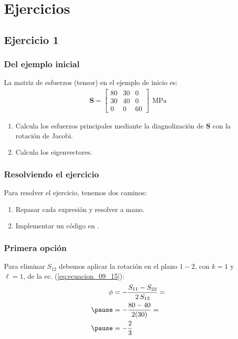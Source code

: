\documentclass[12pt]{beamer}
\begin{document}
\section{Ejercicios}
\subsection{Ejercicio 1}

\begin{frame}
\frametitle{Del ejemplo inicial}
La matriz de esfuerzos (tensor) en el ejemplo de inicio es:
\pause
\renewcommand{\arraystretch}{1}
\begin{align*}
\mathbf{S} =
\begin{bmatrix}
80 & 30 & 0 \\
30 & 40 & 0 \\
0 & 0 & 60
\end{bmatrix} \, \SI{}{\mega\pascal}
\end{align*}
\pause
{}
\begin{enumerate}[<+->]
\item Calcula los esfuerzos principales mediante la diagnolización de $\mathbf{S}$ con la rotación de Jacobi.
\item Calcula los eigenvectores.
\end{enumerate}
\end{frame}
\begin{frame}
\frametitle{Resolviendo el ejercicio}
Para resolver el ejercicio, tenemos dos caminos:
\pause
{}
\begin{enumerate}[<+->]
\item Repasar cada expresión y resolver a mano.
\item Implementar un código en \python.
\end{enumerate}
\end{frame}
\begin{frame}
\frametitle{Primera opción}
Para eliminar $S_{12}$ debemos aplicar la rotación en el plano $1-2$, \pause con $k = 1$ y $\ell = 1$, \pause de la ec. (\ref{eq:ecuacion_09_15}):
\pause
\begin{eqnarray*}
\begin{aligned}
\phi &= - \dfrac{S_{11} - S_{22}}{2 \, S_{12}} = \\ \pause
&= - \dfrac{80 - 40}{2 (30)} = \\ \pause
&= - \dfrac{2}{3}
\end{aligned}
\end{eqnarray*}
\end{frame}
\end{document}
